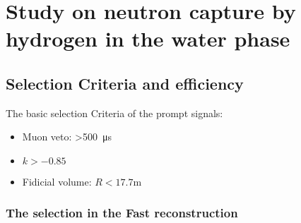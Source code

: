 \section{Study on neutron capture by hydrogen in the water phase}
\subsection{Selection Criteria and efficiency}
The basic selection Criteria of the prompt signals:
\begin{itemize}
	\item Muon veto: >\SI{500}{\micro s}
	\item $k>-0.85$
	\item Fidicial volume: $R<17.7$\si{m}
\end{itemize}
\subsubsection{The selection in the Fast reconstruction}

